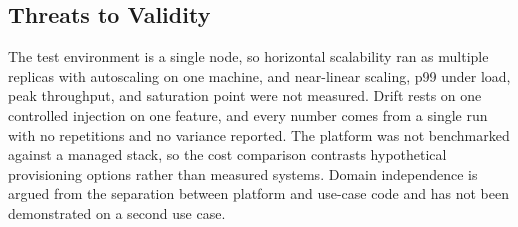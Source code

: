 \subsection{Threats to Validity}
\label{subsec:threats}

The test environment is a single node, so horizontal scalability ran as multiple replicas with autoscaling on one machine, and near-linear scaling, p99 under load, peak throughput, and saturation point were not measured. Drift rests on one controlled injection on one feature, and every number comes from a single run with no repetitions and no variance reported. The platform was not benchmarked against a managed stack, so the cost comparison contrasts hypothetical provisioning options rather than measured systems. Domain independence is argued from the separation between platform and use-case code and has not been demonstrated on a second use case.
